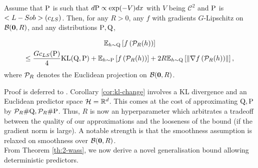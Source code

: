 \begin{corollary}
  \label{cor:kl-change}
  Assume that $\P$ is such that $d\P \propto \exp(-V)dx$ with $V$ being $\mathcal{C}^2$ and $\P$ is $\Lsob(c_{LS})$. Then, for any $R>0$, any $f$ with gradients $G$-Lipschitz on $\Bcal(\zerobf,R)$, and any distributions $\P,\Q$, 

  \begin{multline*} \mathbb{E}_{h\sim \Q}\LB f\LP\Pcal_R(h)\RP \RB \\
    \leq \frac{Gc_{LS}(\P)}{4}\KL(\Q,\P) + \mathbb{E}_{h\sim \P}\LB f\LP\Pcal_R(h)\RP \RB + 2R\mathbb{E}_{h\sim \Q} \LB \LM\nabla f \LP\Pcal_R(h)  \RP \RM \RB,  
  \end{multline*}
  where $\Pcal_R$ denotes the Euclidean projection on $\Bcal(\zerobf,R)$.
\end{corollary}
Proof is deferred to .
Corollary \ref{cor:kl-change} involves a KL divergence and an Euclidean predictor space $\Hcal= \Rbb^d$. This comes at the cost of approximating $\Q,\P$ by $\Pcal_R\#\Q,\Pcal_R\#\P$. Thus, $R$ is now an hyperparameter which arbitrates a tradeoff between the quality of our approximations and the looseness of the bound (if the gradient norm is large). A notable strength is that the smoothness assumption is relaxed on smoothness over $\Bcal(\zerobf,R)$.
\\

\noindent{}From Theorem \ref{th:2-wass}, we now derive a novel generalisation bound allowing deterministic predictors.

